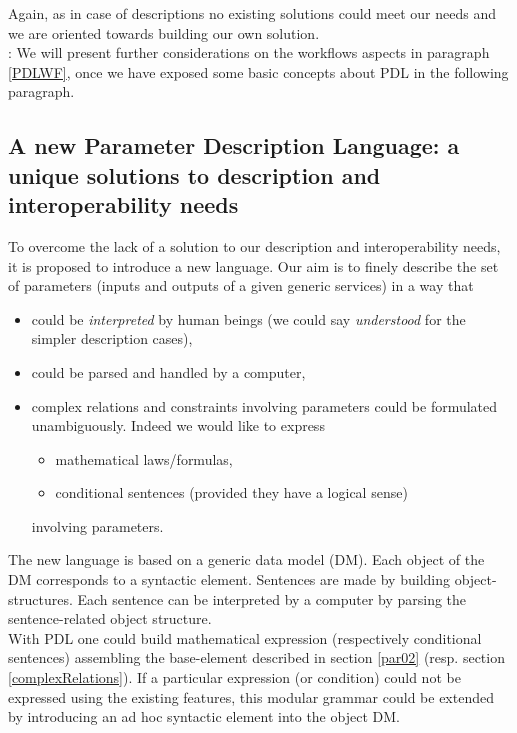 \documentclass[a4paper,11pt] {ivoa}
\begin{document}
Again, as in case of descriptions no existing solutions could meet our needs and we are oriented
towards building our own solution.\\

: We will present further considerations on the workflows aspects in paragraph \ref{PDLWF}, once we have exposed some basic concepts about PDL in the following paragraph.  

\subsection{A new Parameter Description Language: a unique solutions to description and interoperability needs}
To overcome the lack of a  solution to our description and interoperability
needs, it is proposed to introduce a new language.
Our aim is to finely describe the set of parameters (inputs and outputs of a given generic services)
in a way that
\begin{itemize}
\item could be {\it interpreted} by human beings (we could say {\it understood} for the simpler description cases),
\item could be parsed and handled by a computer,
\item complex relations and constraints involving parameters could be formulated unambiguously.
Indeed we would like to express
\begin{itemize}
\item mathematical laws/formulas,
\item conditional sentences (provided they have a logical sense)
\end{itemize}
involving parameters.
\end{itemize}
The new language is based on a generic data model (DM). Each object of the DM corresponds to a
syntactic element. Sentences are made by building object-structures.
Each sentence can be interpreted by a computer by parsing the sentence-related object structure.\\

With PDL one could build mathematical expression (respectively conditional sentences) assembling the base-element described in section \ref{par02} (resp. section \ref{complexRelations}).  If a particular expression (or condition) could not be expressed using the existing features,
this modular grammar could be extended by introducing an ad hoc syntactic element into the object DM. \\
\end{document}
